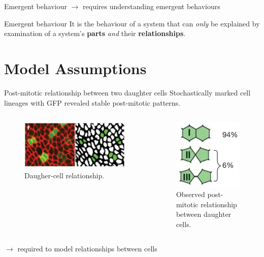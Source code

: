 \documentclass[aspectratio=169, 10pt]{beamer}
\begin{document}
\begin{frame}[fragile]{Emergent behaviour}  
    $\rightarrow$ requires understanding emergent behaviours
    \begin{alertblock}{Emergent behaviour}
        \vspace{5pt}
        It is the behaviour of a system that can \emph{only} be explained by examination of a system's \textbf{parts} \emph{and} their \textbf{relationships}.
    \end{alertblock}
\end{frame}

\section{Model Assumptions}

\begin{frame}[fragile]{Post-mitotic relationship between two daughter cells}
  Stochastically marked cell lineages with GFP revealed stable post-mitotic patterns.     
  \begin{columns}[]
    \begin{figure}[b]
      \centering
      \includegraphics[width=\textwidth]{figures/daughter-cell-relationship.png}
      \caption{Daugher-cell relationship.}
      \label{}
    \end{figure}
        \begin{figure}[b]
            \centering
            \includegraphics[width=.4\textwidth]{figures/post-mitotic-relationship.png}
            \caption{Observed post-mitotic relationship between daughter cells.}
            \label{}
    \end{figure}
  \end{columns}  
  $\rightarrow$ required to model relationships between cells
\end{frame}
\end{document}

